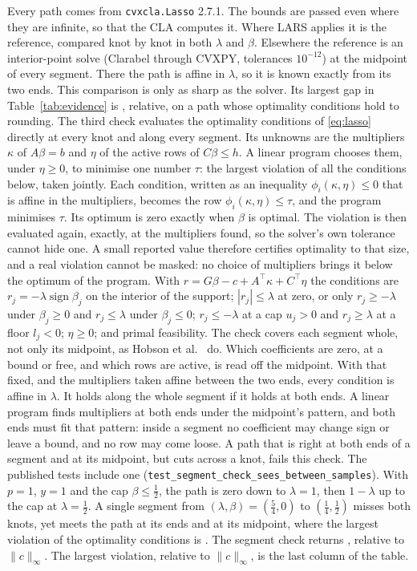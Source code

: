 \documentclass[11pt]{article}
\theoremstyle{remark}
\newcommand{\trans}{^{\top}}
\begin{document}
Every path comes from \texttt{cvxcla.Lasso} 2.7.1. The bounds are passed even where
they are infinite, so that the CLA computes it. Where LARS applies it is the reference,
compared knot by knot in both $\lambda$ and $\beta$. Elsewhere the reference is an
interior-point solve (Clarabel through CVXPY, tolerances $10^{-12}$) at the midpoint of
every segment. There the path is affine in $\lambda$, so it is known exactly from its
two ends. This comparison is only as sharp as the solver. Its largest gap in
Table~\ref{tab:evidence} is \evIpmWorst{}, relative, on a path whose optimality
conditions hold to rounding. The third check evaluates the optimality conditions of \eqref{eq:lasso}
directly at every knot and along every segment. Its unknowns are the multipliers
$\kappa$ of $A\beta=b$ and $\eta$ of the active rows of $C\beta\le h$. A linear program
chooses them, under $\eta\ge0$, to minimise one number $\tau$: the largest violation of
all the conditions below, taken jointly. Each condition, written as an inequality
$\phi_i(\kappa,\eta)\le0$ that is affine in the multipliers, becomes the row
$\phi_i(\kappa,\eta)\le\tau$, and the program minimises $\tau$. Its optimum is zero
exactly when $\beta$ is optimal. The violation is then evaluated again, exactly, at the
multipliers found, so the solver's own tolerance cannot hide one. A small reported
value therefore certifies optimality to that size, and a real violation cannot be
masked: no choice of multipliers brings it below the optimum of the program. With
$r=G\beta-c+A\trans\kappa+C\trans\eta$ the conditions are
$r_j=-\lambda\operatorname{sign}\beta_j$ on the interior of the support;
$|r_j|\le\lambda$ at zero, or only $r_j\ge-\lambda$ under $\beta_j\ge0$ and
$r_j\le\lambda$ under $\beta_j\le0$; $r_j\le-\lambda$ at a cap $u_j>0$ and
$r_j\ge\lambda$ at a floor $l_j<0$; $\eta\ge0$; and primal feasibility. The check
covers each segment whole, not only its midpoint, as Hobson et al.\ \cite{hobson2026}
do. Which coefficients are zero, at a bound or free, and which rows are active, is
read off the midpoint. With that fixed, and the multipliers taken affine between the two ends, every
condition is affine in $\lambda$. It holds along the whole segment if it holds at both
ends. A linear program finds multipliers at both ends under the midpoint's pattern, and
both ends must fit that pattern: inside a segment no coefficient may change sign or
leave a bound, and no row may come loose. A path that is right at both ends of a
segment and at its midpoint, but cuts across a knot, fails this check. The published
tests include one (\texttt{test\_segment\_check\_sees\_between\_samples}). With $p=1$,
$y=1$ and the cap $\beta\le\tfrac12$, the path is zero down to $\lambda=1$, then
$1-\lambda$ up to the cap at $\lambda=\tfrac12$. A single segment from
$(\lambda,\beta)=(\tfrac54,0)$ to $(\tfrac14,\tfrac12)$ misses both knots, yet meets the
path at its ends and at its midpoint, where the largest violation of the optimality
conditions is \evSegSampled{}. The segment check returns \evSegWhole{}, relative to $\|c\|_\infty$. The
largest violation, relative to $\|c\|_\infty$, is the last column of the table.
\end{document}
